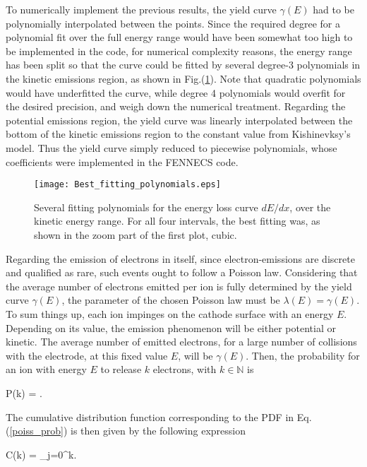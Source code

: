\noindent To numerically implement the previous results, the yield curve $\gamma(E)$ had to be polynomially interpolated between the points. Since the required degree for a polynomial fit over the full energy range would have been somewhat too high to be implemented in the code, for numerical complexity reasons, the energy range has been split so that the curve could be fitted by several degree-3 polynomials in the kinetic emissions region, as shown in Fig.(\ref{Best_fit}). Note that quadratic polynomials would have underfitted the curve, while degree 4 polynomials would overfit for the desired precision, and weigh down the numerical treatment. Regarding the potential emissions region, the yield curve was linearly interpolated between the bottom of the kinetic emissions region to the constant value from Kishinevksy's model. Thus the yield curve simply reduced to piecewise polynomials, whose coefficients were implemented in the FENNECS code.\\

\begin{figure}[h!]
\centering
	\texttt{[image: Best\_fitting\_polynomials.eps]}
	\caption{\label{Best_fit} Several fitting polynomials for the energy loss curve $dE/dx$, over the kinetic energy range. For all four intervals, the best fitting was, as shown in the zoom part of the first plot, cubic.} 
\end{figure}  


Regarding the emission of electrons in itself, since electron-emissions are discrete and qualified as rare, such events ought to follow a Poisson law. Considering that the average number of electrons emitted per ion is fully determined by the yield curve $\gamma(E)$, the parameter of the chosen Poisson law must be $\lambda(E) = \gamma(E)$. To sum things up, each ion impinges on the cathode surface with an energy $E$. Depending on its value, the emission phenomenon will be either potential or kinetic. The average number of emitted electrons, for a large number of collisions with the electrode, at this fixed value $E$, will be $\gamma(E)$. Then, the probability for an ion with energy $E$ to release $k$ electrons, with $k\in \mathbb{N}$ is

\beq
P(k) = .\label{poiss_prob}
\eeq

\noindent The cumulative distribution function corresponding to the PDF in Eq.(\ref{poiss_prob}) is then given by the following expression 


\beq
C(k) = \sum_{j=0}^{\lfloor k\rfloor}. \label{poisson_dist}
\eeq


